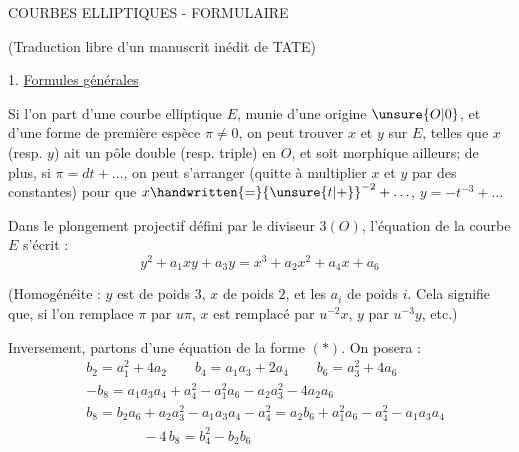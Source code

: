 
\begin{center}
COURBES ELLIPTIQUES - FORMULAIRE

(Traduction libre d'un manuscrit inédit de TATE)
\end{center}


1. \uline{Formules générales}

Si l'on part d'une courbe elliptique $E$, munie d'une origine $\unsure{O|0}$, et d'une forme de première espèce $\pi\ne 0$, on peut trouver $x$ et $y$ sur $E$, telles que $x$ (resp. $y$) ait un pôle double (resp. triple) en $O$, et soit morphique ailleurs; de plus, si $\pi=dt+\ldots$, on peut s'arranger (quitte à multiplier $x$ et $y$ par des constantes) pour que $x\handwritten{=}{\unsure{t|+}}^{-2}+\ldots$, $y=-t^{-3}+\ldots$

Dans le plongement projectif défini par le diviseur $3(O)$, l'équation de la courbe $E$ s'écrit :
{\makeatletter\tagsleft@true\makeatother
\[
 y^{2}+a_{1}xy+a_{3}y=x^{3}+a_{2}x^{2}+a_{4}x+a_{6}
 \tag*{$(\ast)$}
\]
}

(Homogénéite : $y$ est de poids $3$, $x$ de poids $2$, et les $a_{i}$ de poids $i$. Cela signifie que, si l'on remplace $\pi$ par $u\pi$, $x$ est remplacé par $u^{-2}x$, $y$ par $u^{-3}y$, etc.)

Inversement, partons d'une équation de la forme $(\ast)$. On posera :
\[
\begin{aligned}
& b_{2}=a_{1}^{2}+4a_{2} \qquad b_{4}=a_{1}a_{3}+2a_{4} \qquad b_{6}=a_{3}^{2}+4a_{6} \\
& -b_{8}=a_{1}a_{3}a_{4}+a_{4}^{2}-a_{1}^{2}a_{6}-a_{2}a_{3}^{2}-4a_{2}a_{6} \\
& b_{8}=b_{2}a_{6}+a_{2}a_{3}^{2}-a_{1}a_{3}a_{4}-a_{4}^{2}=a_{2}b_{6}+a_{1}^{2}a_{6}-a_{4}^{2}-a_{1}a_{3}a_{4} \\
& \hspace{4em}-4\,b_{8}=b_{4}^{2}-b_{2}b_{6}
\end{aligned}
\]


